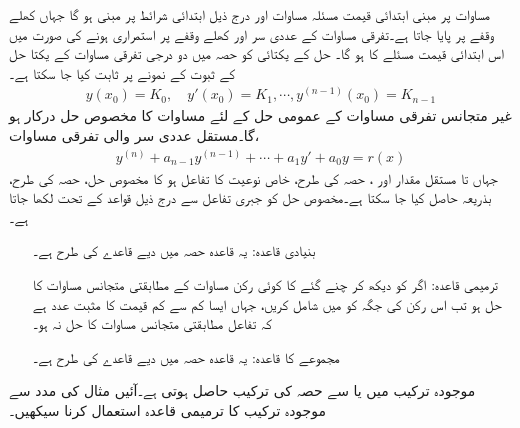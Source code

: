 مساوات  پر مبنی ابتدائی قیمت مسئلہ مساوات  اور درج ذیل  ابتدائی شرائط پر مبنی ہو گا جہاں  کھلے وقفے  پر پایا جاتا ہے۔تفرقی مساوات کے عددی سر اور  کھلے وقفے پر استمراری ہونے کی صورت میں اس ابتدائی قیمت مسئلے کا  ہو گا۔ حل کے یکتائی کو حصہ  میں دو درجی تفرقی مساوات کے یکتا حل کے ثبوت کے نمونے پر ثابت کیا جا سکتا ہے۔
\begin{align}
y(x_0)=K_0, \quad y'(x_0)=K_1, \cdots , y^{(n-1)}(x_0)=K_{n-1}
\end{align}
غیر متجانس تفرقی مساوات  کے عمومی حل کے لئے مساوات  کا مخصوص حل درکار ہو گا۔مستقل عددی سر والی تفرقی مساوات،
\begin{align}\label{مساوات_سادہ_بلند_مستقل_عددی_سر_غیر_متجانس_الف}
y^{(n)}+a_{n-1}y^{(n-1)}+\cdots+a_1y'+a_0 y=r(x)
\end{align}
جہاں  تا  مستقل مقدار اور ، حصہ  کی طرح، خاص نوعیت کا تفاعل ہو کا مخصوص حل،  حصہ  کی طرح، بذریعہ  حاصل کیا جا سکتا ہے۔مخصوص حل  کو جبری تفاعل  سے درج ذیل قواعد کے تحت لکھا جاتا ہے۔
\begin{enumerate}
\item[بنیادی قاعدہ:]\label{قاعدہ_سادہ_بلند_بنیادی_قاعدہ}
یہ قاعدہ حصہ  میں دیے قاعدے  کی طرح ہے۔
\item[ترمیمی قاعدہ:]\label{قاعدہ_سادہ_بلند_ترمیمی_قاعدہ}
اگر  کو دیکھ کر چنے گئے   کا کوئی رکن   مساوات  کے  مطابقتی متجانس مساوات کا حل  ہو تب  اس رکن کی جگہ  کو   میں شامل کریں، جہاں  ایسا کم سے کم قیمت کا مثبت عدد ہے کہ تفاعل  مطابقتی متجانس مساوات کا حل نہ ہو۔
\item[مجموعے کا قاعدہ:]\label{قاعدہ_سادہ_بلند_مجموعہ_قاعدہ}
یہ قاعدہ حصہ  میں دیے قاعدے کی طرح ہے۔
\end{enumerate} 

موجودہ ترکیب میں  یا  سے حصہ  کی ترکیب حاصل ہوتی ہے۔آئیں مثال کی مدد سے موجودہ ترکیب کا ترمیمی قاعدہ  استعمال کرنا سیکھیں۔

